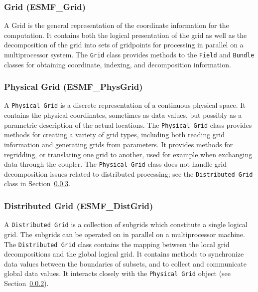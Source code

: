 \subsubsection{Grid (ESMF\_Grid)}
\label{sec:grid} 
A Grid is the general representation of the coordinate information for
the computation.  It contains both the logical presentation of the grid 
as well as the
decomposition of the grid into sets of gridpoints for processing in parallel on a
multiprocessor system.  The {\tt Grid} class provides methods to the
{\tt Field} and {\tt Bundle} classes for obtaining coordinate, indexing, and 
decomposition information.

\subsubsection{Physical Grid (ESMF\_PhysGrid)}
\label{sec:physgrid} 
A {\tt Physical Grid} is a discrete representation of a continuous physical space.  It contains the physical coordinates, sometimes as data values, but possibly
as a parametric description of the actual locations.  
The {\tt Physical Grid} class provides methods for creating a variety of grid 
types, including both reading grid information
and generating grids from parameters.  It provides methods for regridding, or translating
one grid to another, used for example when exchanging data through the coupler.
The {\tt Physical Grid} class does not handle grid decomposition issues related to 
distributed processing; see the {\tt Distributed Grid} class in 
Section~\ref{sec:distgrid}.

\subsubsection{Distributed Grid (ESMF\_DistGrid)} 
\label{sec:distgrid} 
A {\tt Distributed Grid} is a collection of subgrids which
constitute a single logical grid.  The subgrids can be operated on in
parallel on a multiprocessor machine.  The {\tt Distributed Grid} class contains the mapping
between the local grid decompositions and the global logical grid. 
It contains methods to 
synchronize data values between the boundaries of subsets, and to
collect and communicate global data values.  It interacts closely with
the {\tt Physical Grid} object (see Section~\ref{sec:physgrid}).

